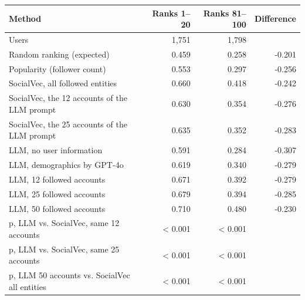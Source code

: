 \begin{tabular}{lrrr}
\toprule
Method & Ranks 1--20 & Ranks 81--100 & Difference \\
\midrule
Users & 1,751 & 1,798 &  \\
Random ranking (expected) & 0.459 & 0.258 & -0.201 \\
Popularity (follower count) & 0.553 & 0.297 & -0.256 \\
SocialVec, all followed entities & 0.660 & 0.418 & -0.242 \\
SocialVec, the 12 accounts of the LLM prompt & 0.630 & 0.354 & -0.276 \\
SocialVec, the 25 accounts of the LLM prompt & 0.635 & 0.352 & -0.283 \\
LLM, no user information & 0.591 & 0.284 & -0.307 \\
LLM, demographics by GPT-4o & 0.619 & 0.340 & -0.279 \\
LLM, 12 followed accounts & 0.671 & 0.392 & -0.279 \\
LLM, 25 followed accounts & 0.679 & 0.394 & -0.285 \\
LLM, 50 followed accounts & 0.710 & 0.480 & -0.230 \\
p, LLM vs. SocialVec, same 12 accounts & \textless{} 0.001 & \textless{} 0.001 &  \\
p, LLM vs. SocialVec, same 25 accounts & \textless{} 0.001 & \textless{} 0.001 &  \\
p, LLM 50 accounts vs. SocialVec all entities & \textless{} 0.001 & \textless{} 0.001 &  \\
\bottomrule
\end{tabular}
